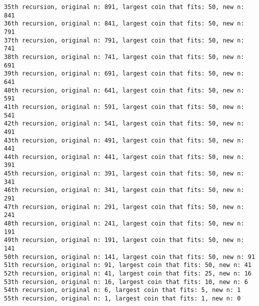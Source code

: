 \documentclass[12pt]{article}
\newenvironment{question}[2][Question]{\begin{trivlist}
		\item[\hskip \labelsep {\bfseries #1}\hskip \labelsep {\bfseries #2.}]}{\end{trivlist}}
\begin{document}
\begin{question}{1a}
\begin{lstlisting}
35th recursion, original n: 891, largest coin that fits: 50, new n: 841
36th recursion, original n: 841, largest coin that fits: 50, new n: 791
37th recursion, original n: 791, largest coin that fits: 50, new n: 741
38th recursion, original n: 741, largest coin that fits: 50, new n: 691
39th recursion, original n: 691, largest coin that fits: 50, new n: 641
40th recursion, original n: 641, largest coin that fits: 50, new n: 591
41th recursion, original n: 591, largest coin that fits: 50, new n: 541
42th recursion, original n: 541, largest coin that fits: 50, new n: 491
43th recursion, original n: 491, largest coin that fits: 50, new n: 441
44th recursion, original n: 441, largest coin that fits: 50, new n: 391
45th recursion, original n: 391, largest coin that fits: 50, new n: 341
46th recursion, original n: 341, largest coin that fits: 50, new n: 291
47th recursion, original n: 291, largest coin that fits: 50, new n: 241
48th recursion, original n: 241, largest coin that fits: 50, new n: 191
49th recursion, original n: 191, largest coin that fits: 50, new n: 141
50th recursion, original n: 141, largest coin that fits: 50, new n: 91
51th recursion, original n: 91, largest coin that fits: 50, new n: 41
52th recursion, original n: 41, largest coin that fits: 25, new n: 16
53th recursion, original n: 16, largest coin that fits: 10, new n: 6
54th recursion, original n: 6, largest coin that fits: 5, new n: 1
55th recursion, original n: 1, largest coin that fits: 1, new n: 0

\end{lstlisting}
			
	\end{question}
\end{document}
